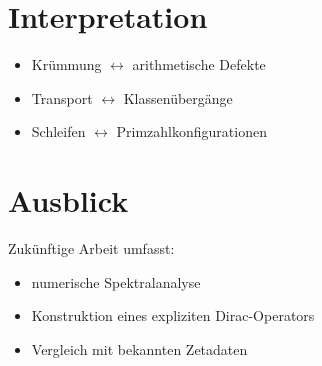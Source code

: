 \documentclass{article}
\begin{document}
	\section{Interpretation}
	
	\begin{itemize}
		\item Krümmung $\leftrightarrow$ arithmetische Defekte
		\item Transport $\leftrightarrow$ Klassenübergänge
		\item Schleifen $\leftrightarrow$ Primzahlkonfigurationen
	\end{itemize}
	
	\section{Ausblick}
	
	Zukünftige Arbeit umfasst:
	\begin{itemize}
		\item numerische Spektralanalyse
		\item Konstruktion eines expliziten Dirac-Operators
		\item Vergleich mit bekannten Zetadaten
	\end{itemize}
	
\end{document}
